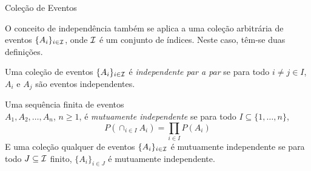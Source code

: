 \begin{frame}{}

\begin{block}{Coleção de Eventos}

O conceito de independência também se aplica a uma coleção
arbitrária de eventos $\{A_i\}_{i\in {\cal I}}$, onde ${\cal I}$ é um conjunto
de índices. Neste caso, têm-se duas definições.
\end{block}

\begin{defi}
	Uma coleção de eventos $\{A_i\}_{i\in {\cal I}}$ é {\em independente par a
		par} se para todo $i \ne j\in I$, $A_i$ e $A_j$ são eventos
	independentes.
\end{defi}


	\begin{defi}
		Uma sequência finita de eventos\\ $A_1,A_2,\ldots,A_n$, $n\geq 1$, é {\em
			mutuamente independente} se para todo $I\subseteq \{1,\ldots,n\}$,
		$$P(\cap_{i\in I}A_i)=\prod_{i\in I}P(A_i)$$
		E uma coleção qualquer de eventos $\{A_i\}_{i\in {\cal I}}$ é mutuamente
		independente se para todo $J\subseteq {\cal I}$ finito, $\{A_i\}_{i\in J}$
		é mutuamente independente.
	\end{defi}

\end{frame}





